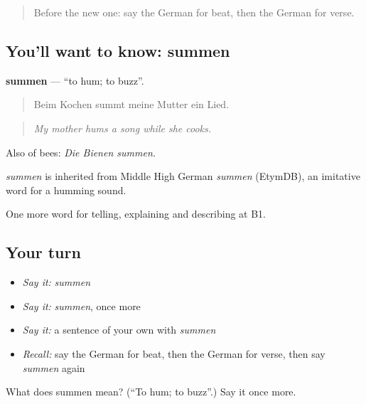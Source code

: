 \label{lesson:GE-C514-summen}



\begin{quote}
Before the new one: say the German for beat, then the German for verse.
\end{quote}

\subsection*{You'll want to know: summen}
\textbf{summen} — \textquotedblleft{}to hum; to buzz\textquotedblright{}.

\begin{quote}
Beim Kochen summt meine Mutter ein Lied.
\end{quote}

\begin{quote}
\emph{My mother hums a song while she cooks.}
\end{quote}

Also of bees: \emph{Die Bienen summen.}

\begin{cousinweb}
\emph{summen} is inherited from Middle High German \emph{summen} (EtymDB), an imitative word for a humming sound.
\end{cousinweb}

\begin{grammarlens}[title={What you've built}]
One more word for telling, explaining and describing at B1.
\end{grammarlens}

\subsection*{Your turn}
\begin{itemize}
\raggedright
  \item \emph{Say it:} \emph{summen}
  \item \emph{Say it:} \emph{summen}, once more
  \item \emph{Say it:} a sentence of your own with \emph{summen}
  \item \emph{Recall:} say the German for beat, then the German for verse, then say \emph{summen} again
\end{itemize}

\begin{tcolorbox}[breakable,colback=teal!4,colframe=teal!35!black,title={Before you move on}]
What does summen mean? (\textquotedblleft{}To hum; to buzz\textquotedblright{}.) Say it once more.
\end{tcolorbox}
